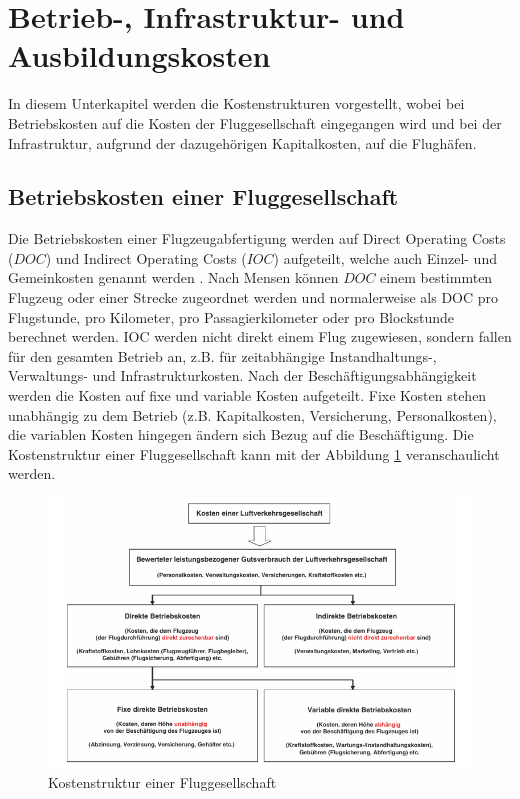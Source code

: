 \section{Betrieb-, Infrastruktur- und Ausbildungskosten}
\label{s:Kosten}
In diesem Unterkapitel werden die Kostenstrukturen vorgestellt, 
wobei bei Betriebskosten auf die Kosten der Fluggesellschaft
eingegangen wird und bei der Infrastruktur, aufgrund der dazugehörigen Kapitalkosten, auf die Flughäfen.
%
\subsection{Betriebskosten einer Fluggesellschaft}

Die Betriebskosten einer Flugzeugabfertigung werden auf Direct Operating Costs ($DOC$) und Indirect Operating Costs 
($IOC$) aufgeteilt, welche auch Einzel- und\\ Gemeinkosten genannt werden \cite{conrady2019luftverkehr}. 
Nach Mensen \cite{mensen2013handbuch} können $DOC$ einem bestimmten Flugzeug oder einer Strecke zugeordnet 
werden und normalerweise als DOC pro Flugstunde, pro Kilometer, pro Passagierkilometer oder pro Blockstunde 
berechnet werden. IOC werden nicht direkt einem Flug zugewiesen, sondern fallen für den gesamten Betrieb an, 
z.B. für zeitabhängige Instandhaltungs-, Verwaltungs- und Infrastrukturkosten. 
Nach der Beschäftigungsabhängigkeit werden die Kosten auf fixe und variable Kosten aufgeteilt. 
Fixe Kosten stehen unabhängig zu dem Betrieb (z.B. Kapitalkosten, Versicherung, Personalkosten), 
die variablen Kosten hingegen ändern sich Bezug auf die Beschäftigung.
%
Die Kostenstruktur einer Fluggesellschaft kann mit der Abbildung \ref{doc} veranschaulicht werden.
%
\begin{figure}[h]
	\centering
	\includegraphics[width=0.9\linewidth]{Bilder/Systematik der DOC_Berechnung.png}
	\caption[Kostenstruktur einer Fluggesellschaft]{Kostenstruktur einer Fluggesellschaft \cite{mensen2013handbuch}}
	\label{doc}
\end{figure}

